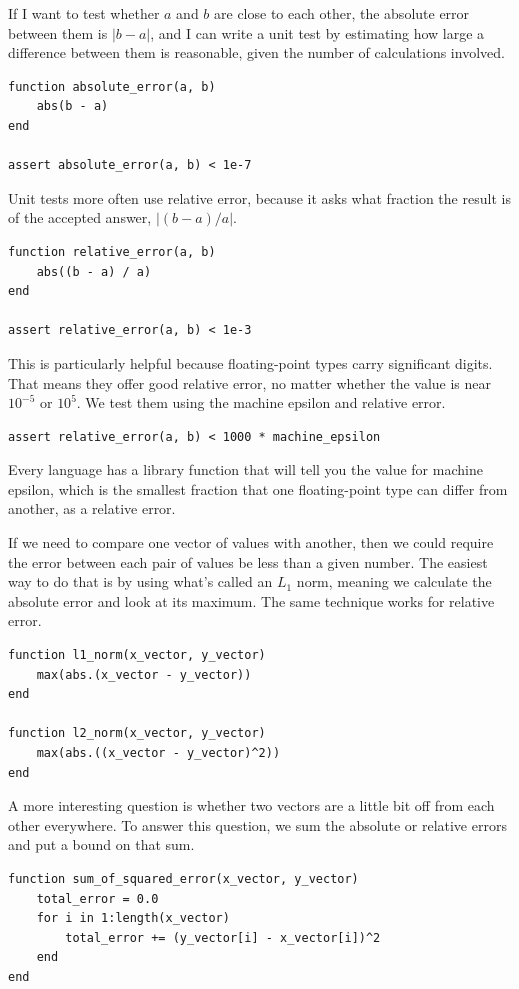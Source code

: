 \documentclass[fleqn,10pt]{olplainarticle}
\begin{document}
If I want to test whether $a$ and $b$ are close to each other,
the absolute error between them is $|b-a|$, and I can write a unit
test by estimating how large a difference between them is reasonable,
given the number of calculations involved.
\begin{lstlisting}
function absolute_error(a, b)
    abs(b - a)
end

assert absolute_error(a, b) < 1e-7
\end{lstlisting}
Unit tests more often use relative error, because it asks what
fraction the result is of the accepted answer, $|(b - a) / a|$.
\begin{lstlisting}
function relative_error(a, b)
    abs((b - a) / a)
end

assert relative_error(a, b) < 1e-3
\end{lstlisting}
This is particularly helpful because floating-point types carry
significant digits. That means they offer good relative error,
no matter whether the value is near $10^{-5}$ or $10^5$. We test
them using the machine epsilon and relative error.
\begin{lstlisting}
assert relative_error(a, b) < 1000 * machine_epsilon
\end{lstlisting}
Every language has a library function that will tell you the
value for machine epsilon, which is the smallest fraction that
one floating-point type can differ from another, as a relative
error.

If we need to compare one vector of values with another, then
we could require the error between each pair of values be less
than a given number. The easiest way to do that is by using
what's called an $L_1$ norm, meaning we calculate the absolute error and
look at its maximum. The same technique works for relative error.
\begin{lstlisting}
function l1_norm(x_vector, y_vector)
    max(abs.(x_vector - y_vector))
end

function l2_norm(x_vector, y_vector)
    max(abs.((x_vector - y_vector)^2))
end
\end{lstlisting}

A more interesting question is whether two vectors are a little
bit off from each other everywhere. To answer this question,
we sum the absolute or relative errors and put a bound on that
sum.
\begin{lstlisting}
function sum_of_squared_error(x_vector, y_vector)
    total_error = 0.0
    for i in 1:length(x_vector)
    	total_error += (y_vector[i] - x_vector[i])^2
    end
end
\end{lstlisting}
\end{document}
